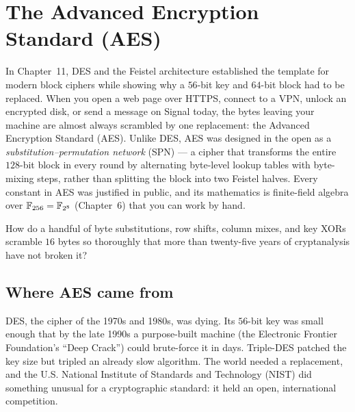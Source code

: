 \chapter{The Advanced Encryption Standard (AES)}

In Chapter~11, DES and the Feistel architecture established the template for modern block ciphers while showing why a $56$-bit key and $64$-bit block had to be replaced. When you open a web page over HTTPS, connect to a VPN, unlock an encrypted disk, or send a message on Signal today, the bytes leaving your machine are almost always scrambled by one replacement: the Advanced Encryption Standard (AES). Unlike DES, AES was designed in the open as a \emph{substitution--permutation network} (SPN) --- a cipher that transforms the entire $128$-bit block in every round by alternating byte-level lookup tables with byte-mixing steps, rather than splitting the block into two Feistel halves. Every constant in AES was justified in public, and its mathematics is finite-field algebra over $\mathbb{F}_{256} = \mathbb{F}_{2^8}$ (Chapter~6) that you can work by hand.

How do a handful of byte substitutions, row shifts, column mixes, and key XORs scramble $16$ bytes so thoroughly that more than twenty-five years of cryptanalysis have not broken it?

\chapterline

\section{Where AES came from}

DES, the cipher of the 1970s and 1980s, was dying. Its $56$-bit key was small
enough that by the late 1990s a purpose-built machine (the Electronic Frontier
Foundation's ``Deep Crack'') could brute-force it in days. Triple-DES patched the
key size but tripled an already slow algorithm. The world needed a replacement,
and the U.S. National Institute of Standards and Technology (NIST) did something
unusual for a cryptographic standard: it held an open, international competition.

